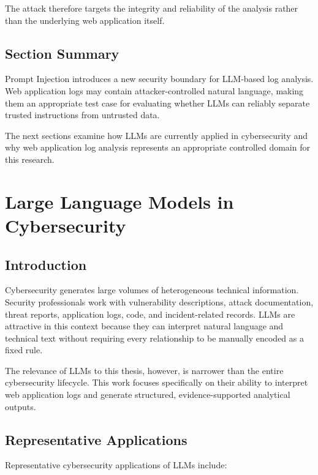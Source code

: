 The attack therefore targets the integrity and reliability of the
analysis rather than the underlying web application itself.

\subsection{Section Summary}\label{section-summary}

Prompt Injection introduces a new security boundary for LLM-based log
analysis. Web application logs may contain attacker-controlled natural
language, making them an appropriate test case for evaluating whether
LLMs can reliably separate trusted instructions from untrusted data.

The next sections examine how LLMs are currently applied in
cybersecurity and why web application log analysis represents an
appropriate controlled domain for this research.

\section{Large Language Models in
Cybersecurity}\label{large-language-models-in-cybersecurity}

\subsection{Introduction}\label{introduction-2}

Cybersecurity generates large volumes of heterogeneous technical
information. Security professionals work with vulnerability
descriptions, attack documentation, threat reports, application logs,
code, and incident-related records. LLMs are attractive in this context
because they can interpret natural language and technical text without
requiring every relationship to be manually encoded as a fixed rule.

The relevance of LLMs to this thesis, however, is narrower than the
entire cybersecurity lifecycle. This work focuses specifically on their
ability to interpret web application logs and generate structured,
evidence-supported analytical outputs.

\subsection{Representative
Applications}\label{representative-applications}

Representative cybersecurity applications of LLMs include:

